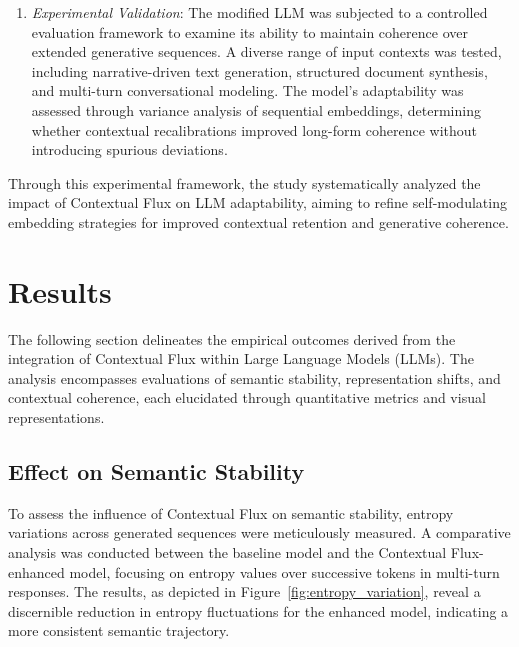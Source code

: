 \documentclass{article}
\begin{document}
\begin{enumerate}
	\item \textit{Experimental Validation}: The modified LLM was subjected to a controlled evaluation framework to examine its ability to maintain coherence over extended generative sequences. A diverse range of input contexts was tested, including narrative-driven text generation, structured document synthesis, and multi-turn conversational modeling. The model's adaptability was assessed through variance analysis of sequential embeddings, determining whether contextual recalibrations improved long-form coherence without introducing spurious deviations.
\end{enumerate}

Through this experimental framework, the study systematically analyzed the impact of Contextual Flux on LLM adaptability, aiming to refine self-modulating embedding strategies for improved contextual retention and generative coherence.




\section{Results}

The following section delineates the empirical outcomes derived from the integration of Contextual Flux within Large Language Models (LLMs). The analysis encompasses evaluations of semantic stability, representation shifts, and contextual coherence, each elucidated through quantitative metrics and visual representations.

\subsection{Effect on Semantic Stability}

To assess the influence of Contextual Flux on semantic stability, entropy variations across generated sequences were meticulously measured. A comparative analysis was conducted between the baseline model and the Contextual Flux-enhanced model, focusing on entropy values over successive tokens in multi-turn responses. The results, as depicted in Figure~\ref{fig:entropy_variation}, reveal a discernible reduction in entropy fluctuations for the enhanced model, indicating a more consistent semantic trajectory.
\end{document}

